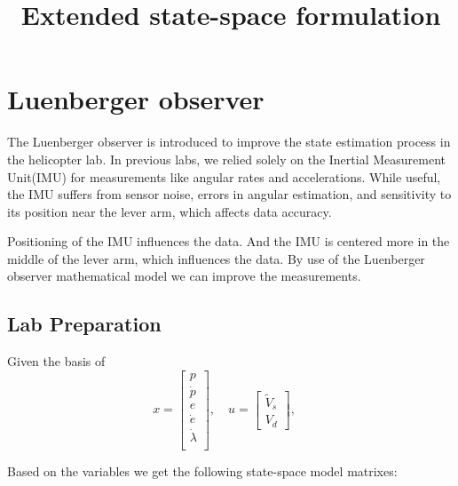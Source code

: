 
\section{Luenberger observer}



The Luenberger observer is introduced to improve the state estimation process in the helicopter lab. In previous labs, we relied solely on the Inertial Measurement Unit(IMU) for measurements like angular rates and accelerations. While useful, the IMU suffers from sensor noise, errors in angular estimation, and sensitivity to its position near the lever arm, which affects data accuracy.
\vspace{1em}

Positioning of the IMU influences the data. And the IMU is centered more in the middle of the lever arm, which influences the data.
By use of the Luenberger observer mathematical model we can improve the measurements.
\vspace{1em}

\subsection{Lab Preparation}
\title{\textbf{Extended state-space formulation}}
\maketitle
\vspace{1em}


Given the basis of
\[
x =
\begin{bmatrix}
{p} \\
\dot{p}\\
{e} \\
\dot{e} \\

\dot{{\lambda}} \\


\end{bmatrix}, \quad
u =
\begin{bmatrix}
\tilde{V}_s \\
V_d
\end{bmatrix}, \quad
\]

Based on the variables we get the following state-space model matrixes:

